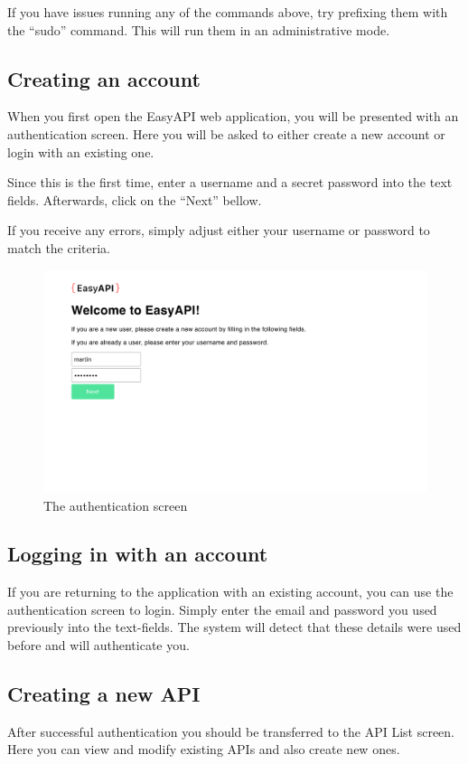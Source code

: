 If you have issues running any of the commands above, try prefixing them with the ``sudo'' command. This will run them in an administrative mode.

\subsection{Creating an account}
When you first open the EasyAPI web application, you will be presented with an authentication screen. Here you will be asked to either create a new account or login with an existing one.

Since this is the first time, enter a username and a secret password into the text fields. Afterwards, click on the ``Next'' bellow.

If you receive any errors, simply adjust either your username or password to match the criteria.

\begin{figure}
\label{login}
\centerline{\includegraphics[scale=0.4]{screenshots/login.png}}
\caption{The authentication screen}
\end{figure}

\subsection{Logging in with an account}
If you are returning to the application with an existing account, you can use the authentication screen to login. Simply enter the email and password you used previously into the text-fields. The system will detect that these details were used before and will authenticate you.


\subsection{Creating a new API}
After successful authentication you should be transferred to the API List screen. Here you can view and modify existing APIs and also create new ones.

